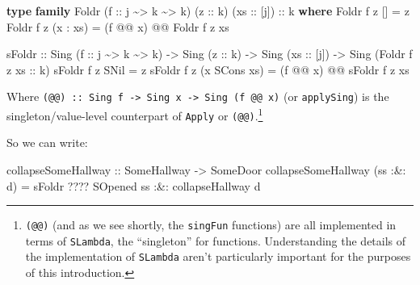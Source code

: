 \documentclass[]{article}
\newenvironment{Shaded}{}{}
\newcommand{\DataTypeTok}[1]{\textcolor[rgb]{0.56,0.13,0.00}{#1}}
\newcommand{\KeywordTok}[1]{\textcolor[rgb]{0.00,0.44,0.13}{\textbf{#1}}}
\newcommand{\NormalTok}[1]{#1}
\newcommand{\OperatorTok}[1]{\textcolor[rgb]{0.40,0.40,0.40}{#1}}
\newcommand{\OtherTok}[1]{\textcolor[rgb]{0.00,0.44,0.13}{#1}}
\begin{document}
\begin{Shaded}
\begin{Highlighting}[]
\KeywordTok{type} \KeywordTok{family} \DataTypeTok{Foldr}\NormalTok{ (}\OtherTok{f ::}\NormalTok{ j }\OperatorTok{\textasciitilde{}>}\NormalTok{ k }\OperatorTok{\textasciitilde{}>}\NormalTok{ k) (}\OtherTok{z ::}\NormalTok{ k) (}\OtherTok{xs ::}\NormalTok{ [j])}\OtherTok{ ::}\NormalTok{ k }\KeywordTok{where}
    \DataTypeTok{Foldr}\NormalTok{ f z \textquotesingle{}[]       }\OtherTok{=}\NormalTok{ z}
    \DataTypeTok{Foldr}\NormalTok{ f z (x \textquotesingle{}}\OperatorTok{:}\NormalTok{ xs) }\OtherTok{=}\NormalTok{ (f }\OperatorTok{@@}\NormalTok{ x) }\OperatorTok{@@} \DataTypeTok{Foldr}\NormalTok{ f z xs}

\NormalTok{sFoldr}
\OtherTok{    ::} \DataTypeTok{Sing}\NormalTok{ (}\OtherTok{f ::}\NormalTok{ j }\OperatorTok{\textasciitilde{}>}\NormalTok{ k }\OperatorTok{\textasciitilde{}>}\NormalTok{ k)}
    \OtherTok{{-}>} \DataTypeTok{Sing}\NormalTok{ (}\OtherTok{z ::}\NormalTok{ k)}
    \OtherTok{{-}>} \DataTypeTok{Sing}\NormalTok{ (}\OtherTok{xs ::}\NormalTok{ [j])}
    \OtherTok{{-}>} \DataTypeTok{Sing}\NormalTok{ (}\DataTypeTok{Foldr}\NormalTok{ f z}\OtherTok{ xs ::}\NormalTok{ k)}
\NormalTok{sFoldr f z }\DataTypeTok{SNil}           \OtherTok{=}\NormalTok{ z}
\NormalTok{sFoldr f z (x }\OtherTok{\textasciigrave{}SCons\textasciigrave{}}\NormalTok{ xs) }\OtherTok{=}\NormalTok{ (f }\OperatorTok{@@}\NormalTok{ x) }\OperatorTok{@@}\NormalTok{ sFoldr f z xs}
\end{Highlighting}
\end{Shaded}

Where
\texttt{(@@)\ ::\ Sing\ f\ -\textgreater{}\ Sing\ x\ -\textgreater{}\ Sing\ (f\ @@\ x)}
(or \texttt{applySing}) is the singleton/value-level counterpart of
\texttt{Apply} or \texttt{(@@)}.\footnote{\texttt{(@@)} (and as we see shortly,
  the \texttt{singFun} functions) are all implemented in terms of
  \texttt{SLambda}, the ``singleton'' for functions. Understanding the details
  of the implementation of \texttt{SLambda} aren't particularly important for
  the purposes of this introduction.}

So we can write:

\begin{Shaded}
\begin{Highlighting}[]
\OtherTok{collapseSomeHallway\textquotesingle{}\textquotesingle{} ::} \DataTypeTok{SomeHallway} \OtherTok{{-}>} \DataTypeTok{SomeDoor}
\NormalTok{collapseSomeHallway\textquotesingle{}\textquotesingle{} (ss }\OperatorTok{:\&:}\NormalTok{ d) }\OtherTok{=}\NormalTok{ sFoldr }\OperatorTok{????} \DataTypeTok{SOpened}\NormalTok{ ss}
                               \OperatorTok{:\&:}\NormalTok{ collapseHallwa\textquotesingle{}\textquotesingle{}y d}
\end{Highlighting}
\end{Shaded}
\end{document}
